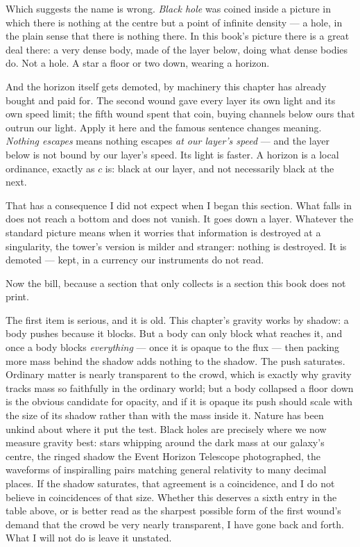 Which suggests the name is wrong. \emph{Black hole} was coined inside a picture in which there is nothing at the centre but a point of infinite density --- a hole, in the plain sense that there is nothing there. In this book's picture there is a great deal there: a very dense body, made of the layer below, doing what dense bodies do. Not a hole. A star a floor or two down, wearing a horizon.

And the horizon itself gets demoted, by machinery this chapter has already bought and paid for. The second wound gave every layer its own light and its own speed limit; the fifth wound spent that coin, buying channels below ours that outrun our light. Apply it here and the famous sentence changes meaning. \emph{Nothing escapes} means nothing escapes \emph{at our layer's speed} --- and the layer below is not bound by our layer's speed. Its light is faster. A horizon is a local ordinance, exactly as $c$ is: black at our layer, and not necessarily black at the next.

That has a consequence I did not expect when I began this section. What falls in does not reach a bottom and does not vanish. It goes down a layer. Whatever the standard picture means when it worries that information is destroyed at a singularity, the tower's version is milder and stranger: nothing is destroyed. It is demoted --- kept, in a currency our instruments do not read.

Now the bill, because a section that only collects is a section this book does not print.

The first item is serious, and it is old. This chapter's gravity works by shadow: a body pushes because it blocks. But a body can only block what reaches it, and once a body blocks \emph{everything} --- once it is opaque to the flux --- then packing more mass behind the shadow adds nothing to the shadow. The push saturates. Ordinary matter is nearly transparent to the crowd, which is exactly why gravity tracks mass so faithfully in the ordinary world; but a body collapsed a floor down is the obvious candidate for opacity, and if it is opaque its push should scale with the size of its shadow rather than with the mass inside it. Nature has been unkind about where it put the test. Black holes are precisely where we now measure gravity best: stars whipping around the dark mass at our galaxy's centre, the ringed shadow the Event Horizon Telescope photographed, the waveforms of inspiralling pairs matching general relativity to many decimal places. If the shadow saturates, that agreement is a coincidence, and I do not believe in coincidences of that size. Whether this deserves a sixth entry in the table above, or is better read as the sharpest possible form of the first wound's demand that the crowd be very nearly transparent, I have gone back and forth. What I will not do is leave it unstated.

